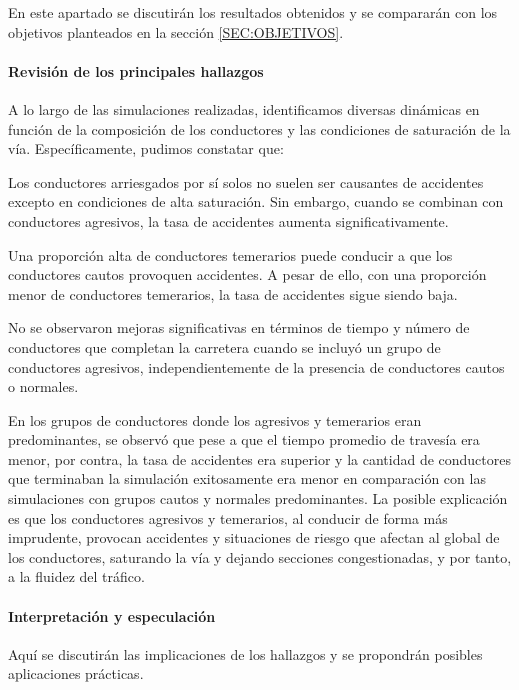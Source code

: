En este apartado se discutirán los resultados obtenidos y se compararán con los objetivos planteados en la sección \ref{SEC:OBJETIVOS}.

\paragraph{Revisión de los principales hallazgos}

A lo largo de las simulaciones realizadas, identificamos diversas dinámicas en función de la composición de los conductores y las condiciones de saturación de la vía. Específicamente, pudimos constatar que:

\phantom{    }Los conductores arriesgados por sí solos no suelen ser causantes de accidentes excepto en condiciones de alta saturación.
Sin embargo, cuando se combinan con conductores agresivos, la tasa de accidentes aumenta significativamente.

\phantom{    }Una proporción alta de conductores temerarios puede conducir a que los conductores cautos provoquen accidentes.
A pesar de ello, con una proporción menor de conductores temerarios, la tasa de accidentes sigue siendo baja.

\phantom{    }No se observaron mejoras significativas en términos de tiempo y número de conductores que completan la carretera cuando
se incluyó un grupo de conductores agresivos, independientemente de la presencia de conductores cautos o normales.

\phantom{    }En los grupos de conductores donde los agresivos y temerarios eran predominantes, se observó que pese a que el tiempo promedio
de travesía era menor, por contra, la tasa de accidentes era superior y la cantidad de conductores que terminaban la simulación exitosamente
era menor en comparación con las simulaciones con grupos cautos y normales predominantes.
La posible explicación es que los conductores agresivos y temerarios, al conducir de forma más imprudente,
provocan accidentes y situaciones de riesgo que afectan al global de los conductores, saturando la vía y dejando secciones congestionadas, y por tanto,
a la fluidez del tráfico.

\paragraph{Interpretación y especulación}

Aquí se discutirán las implicaciones de los hallazgos y se propondrán posibles aplicaciones prácticas.

